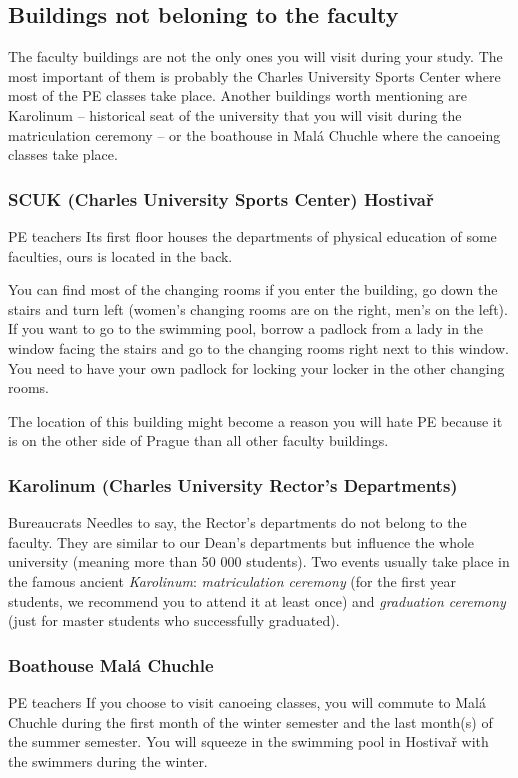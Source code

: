 \subsection{Buildings not beloning to the faculty}
The faculty buildings are not the only ones you will visit during your study.
The most important of them is probably the Charles University Sports Center
where most of the PE classes take place.
Another buildings worth mentioning are Karolinum -- historical seat of the
university that you will visit during the matriculation ceremony -- or the
boathouse in Malá Chuchle where the canoeing classes take place.


\subsubsection{SCUK (Charles University Sports Center) Hostivař}
{PE teachers}
Its first floor houses the departments of physical education of some faculties,
ours is located in the back.

You can find most of the changing rooms if you enter the building, go down the
stairs and turn left (women's changing rooms are on the right, men's on the
left).
If you want to go to the swimming pool, borrow a padlock from a lady in the
window facing the stairs and go to the changing rooms right next to this window.
You need to have your own padlock for locking your locker in the other changing
rooms.

The location of this building might become a reason you will hate PE because it
is on the other side of Prague than all other faculty buildings.


\subsubsection{Karolinum (Charles University Rector's Departments)}
{Bureaucrats}
Needles to say, the Rector's departments do not belong to the faculty. They are
similar to our Dean's departments but influence the whole university (meaning
more than 50 000 students).
Two events usually take place in the famous ancient \textit{Karolinum}:
\textit{matriculation ceremony} (for the first year students, we recommend you
to attend it at least once) and \textit{graduation ceremony} (just for master
students who successfully graduated).


\subsubsection{Boathouse Malá Chuchle}
{PE teachers}
If you choose to visit canoeing classes, you will commute to Malá Chuchle during
the first month of the winter semester and the last month(s) of the summer
semester. You will squeeze in the swimming pool in Hostivař with the swimmers
during the winter.